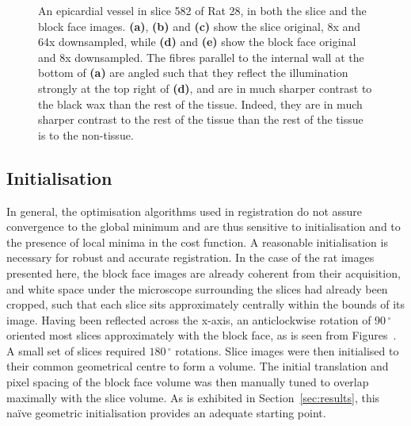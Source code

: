 \begin{figure}
      \caption{An epicardial vessel in slice 582 of Rat 28, in both the slice and the block face images. \textbf{(a)}, \textbf{(b)} and \textbf{(c)} show the slice original, 8x and 64x downsampled, while \textbf{(d)} and \textbf{(e)} show the block face original and 8x downsampled. The fibres parallel to the internal wall at the bottom of \textbf{(a)} are angled such that they reflect the illumination strongly at the top right of \textbf{(d)}, and are in much sharper contrast to the black wax than the rest of the tissue. Indeed, they are in much sharper contrast to the rest of the tissue than the rest of the tissue is to the non-tissue.}
      \label{fig:downsample_zooms}
    \end{figure}
  
  \subsection{Initialisation} %
  \label{sub:initialisation}
    In general, the optimisation algorithms used in registration do not assure convergence to the global minimum and are thus sensitive to initialisation and to the presence of local minima in the cost function. A reasonable initialisation is necessary for robust and accurate registration. In the case of the rat images presented here, the block face images are already coherent from their acquisition, and white space under the microscope surrounding the slices had already been cropped, such that each slice sits approximately centrally within the bounds of its image. Having been reflected across the x-axis, an anticlockwise rotation of $90\,^{\circ}$ oriented most slices approximately with the block face, as is seen from Figures~. A small set of slices required $180\,^{\circ}$ rotations. Slice images were then initialised to their common geometrical centre to form a volume. The initial translation and pixel spacing of the block face volume was then manually tuned to overlap maximally with the slice volume. As is exhibited in Section~\ref{sec:results}, this na\"ive geometric initialisation provides an adequate starting point.	

